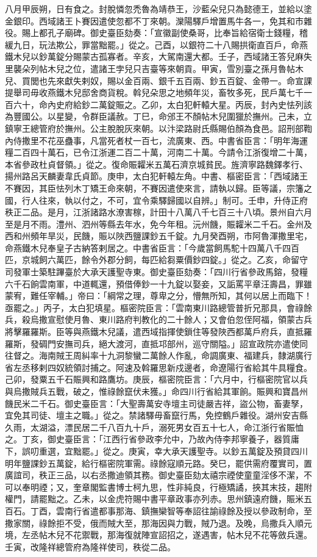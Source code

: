 \begin{pinyinscope}
 八月甲辰朔，日有食之。封脫憐忽禿魯為靖恭王，沙藍朵兒只為懿德王，並給以塗金銀印。西域諸王卜賽因遣使忽都不丁來朝。灤陽驛戶增置馬牛各一，免其和市雜役。賜上都孔子廟碑。御史臺臣劾奏：「宣徽副使桑哥，比奉旨給宿衛士錢糧，稽緩九日，玩法欺公，罪當黜罷。」從之。己酉，以銀符二十八賜拱衛直百戶，命燕鐵木兒以鈔萬錠分賜蒙古孤寡者。辛亥，大駕南還大都。壬子，西域諸王答兒麻失里襲朵列帖木兒之位，遣諸王孛兒只吉臺等來朝貢。甲寅，雪別臺之孫月魯帖木兒、買閭也先來獻失剌奴，賜以金百兩、銀千五百兩、鈔五百錠、金帶一。命宣課提舉司毋收燕鐵木兒邸舍商貨稅。斡兒朵思之地頻年災，畜牧多死，民戶萬七千一百六十，命內史府給鈔二萬錠賑之。乙卯，太白犯軒轅大星。丙辰，封內史怯列該為豐國公。以星變，令群臣議赦。丁巳，命邠王不顏帖木兒圍獵於撫州。己未，立鎮寧王總管府於撫州。公主脫脫灰來朝。以汴梁路尉氏縣賜伯顏為食邑。詔刑部鞫內侍撒里不花巫蠱事，凡當死者杖一百七，流廣東、西。中書省臣言：「明年海運糧二百四十萬石，已令江浙運二百二十萬，河南二十萬。今請令江浙復增二十萬，本省參政杜貞督領。」從之。復命賑糶米五萬石濟京城貧民。旌濟寧路魏鐸孝行、揚州路呂天麟妻韋氏貞節。庚申，太白犯軒轅左角。中書、樞密臣言：「西域諸王不賽因，其臣怯列木丁矯王命來朝，不賽因遣使來言，請執以歸。臣等議，宗籓之國，行人往來，執以付之，不可，宜令乘驛歸國以自辨。」制可。壬申，升侍正府秩正二品。是月，江浙諸路水潦害稼，計田十八萬八千七百三十八頃。景州自六月至是月不雨。澧州、泗州等縣去年水，免今年租。沅州饑，賑糶米二千石。金州及西和州頻年旱災，民饑，賑以陜西鹽課鈔五千錠。九月癸酉朔，市阿魯渾撒里宅，命燕鐵木兒奉皇子古納答剌居之。中書省臣言：「今歲當飼馬駝十四萬八千四百匹，京城飼六萬匹，餘令外郡分飼，每匹給芻粟價鈔四錠。」從之。乙亥，命留守司發軍士築駐蹕臺於大承天護聖寺東。御史臺臣劾奏：「四川行省參政馬鎔，發糧六千石餉雲南軍，中道輒還，預借俸鈔一十九錠以娶妾，又詬罵平章汪壽昌，罪雖蒙宥，難任宰輔。」帝曰：「綱常之理，尊卑之分，懵無所知，其何以居上而臨下！亟罷之。」丙子，太白犯填星。樞密院臣言：「雲南東川路總管普折兄那具，會祿餘兵，殺烏撒宣慰使月魯、東川路府判教化的二十餘人；又會伯忽侄阿福，領蒙古兵將擊羅羅斯。臣等與燕鐵木兒議，遣西域指揮使鎖住等發陜西都萬戶府兵，直抵羅羅斯，發碉門安撫司兵，絕大渡河，直抵邛部州，巡守關隘。」詔宣政院亦遣使同往督之。海南賊王周糾率十九洞黎蠻二萬餘人作亂，命調廣東、福建兵，隸湖廣行省左丞移剌四奴統領討捕之。阿速及斡羅思新戍邊者，命遼陽行省給其牛具糧食。己卯，發粟五千石賑興和路鷹坊。庚辰，樞密院臣言：「六月中，行樞密院官以兵與烏撒賊兵五戰，破之，惟祿餘竄伏未獲。」命四川行省給其軍餉。賑興和寶昌州饑民米二千石。御史臺臣言：「大聖壽萬安寺壇主司徒嚴吉祥，盜公物，畜妻孥，宜免其司徒、壇主之職。」從之。禁諸驛毋畜竄行馬，免控鶴戶雜役。湖州安吉縣久雨，太湖溢，漂民居二千八百九十戶，溺死男女百五十七人，命江浙行省賑恤之。丁亥，御史臺臣言：「江西行省參政李允中，乃故內侍李邦寧養子，器質庸下，誤叨重選，宜黜罷。」從之。庚寅，幸大承天護聖寺。以鈔五萬錠及預貸四川明年鹽課鈔五萬錠，給行樞密院軍需。祿餘寇順元路。癸巳，罷供需府覆實司，置廣誼司，秩正三品，以右丞撒迪領其務。御史臺臣劾太禧宗禋使童童淫侈不潔，不可以奉明禋；又，奎章閣監書博士柯九思，性非純良，行極矯譎，挾其末技，趨附權門，請罷黜之。乙未，以金虎符賜中書平章政事亦列赤。思州鎮遠府饑，賑米五百石。丁酉，雲南行省遣都事那海、鎮撫欒智等奉詔往諭祿餘及授以參政制命，至撒家關，祿餘拒不受，俄而賊大至，那海因與力戰，賊乃退。及晚，烏撒兵入順元境，左丞帖木兒不花禦戰，那海復就陣宣詔招之，遂遇害，帖木兒不花等斂兵還。壬寅，改隆祥總管府為隆祥使司，秩從二品。




\end{pinyinscope}
